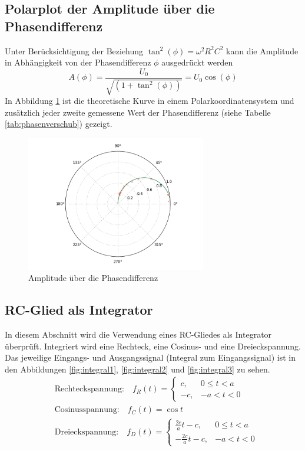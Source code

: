 \clearpage
\subsection{Polarplot der Amplitude über die Phasendifferenz}
Unter Berücksichtigung der Beziehung $\tan^2(\phi) = \omega ^2 R^2 C^2$ kann die Amplitude in Abhängigkeit von der Phasendifferenz $\phi$ ausgedrückt werden
\begin{equation}
A(\phi) = \frac{U_0}{\sqrt{(1+\tan^2(\phi))}} = U_0 \cos(\phi)
\end{equation}
In Abbildung \ref{fig:phasenverschub2} ist die theoretische Kurve in einem Polarkoordinatensystem und zusätzlich jeder zweite gemessene Wert der Phasendifferenz (siehe Tabelle \ref{tab:phasenverschub}) gezeigt.

\begin{figure}[h!]
	\centering
	\includegraphics[width=0.7\textwidth]{Phasenverschub2.png}
	\caption{Amplitude über die Phasendifferenz}
	\label{fig:phasenverschub2}
\end{figure} 



\clearpage
\subsection{RC-Glied als Integrator}
In diesem Abschnitt wird die Verwendung eines RC-Gliedes als Integrator überprüft. Integriert wird eine Rechteck, eine Cosinus- und eine Dreieckspannung. Das jeweilige Eingangs- und Ausgangssignal (Integral zum Eingangssignal) ist in den Abbildungen \ref{fig:integral1}, \ref{fig:integral2} und \ref{fig:integral3} zu sehen.
\begin{align}
	&\text{Rechteckspannung:} \quad f_R(t) = \begin{cases}
		c, & 0\leq t < a \\
		-c, & -a < t < 0
	\end{cases} \\
&\text{Cosinusspannung:} \quad f_C(t) = \cos{t} \\
	&\text{Dreieckspannung:} \quad f_D(t) = \begin{cases}
		\frac{2c}{a} t-c, & 0\leq t < a \\
	-\frac{2c}{a} t-c, & -a < t < 0
	\end{cases} \\
\end{align}

